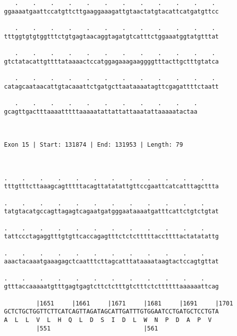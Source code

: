 \documentclass{article}
\begin{document}
\begin{Verbatim}
   .    .    .    .    .    .    .    .    .    .    .    . 
ggaaaatgaattccatgttcttgaaggaaagattgtaactatgtacattcatgatgttcc
                                                            
   .    .    .    .    .    .    .    .    .    .    .    . 
tttggtgtgtggtttctgtgagtaacaggtagatgtcatttctggaaatggtatgtttat
                                                            
   .    .    .    .    .    .    .    .    .    .    .    . 
gtctatacattgttttataaaactccatggagaaagaaggggtttacttgctttgtatca
                                                            
   .    .    .    .    .    .    .    .    .    .    .    . 
catagcaataacattgtacaaattctgatgcttaataaaatagttcgagattttctaatt
                                                            
   .    .    .    .    .    .    .    .    .    .    .
gcagttgactttaaaatttttaaaaatattattattaaatattaaaaatactaa
                                                      
                                                      
 
Exon 15 | Start: 131874 | End: 131953 | Length: 79



.    .    .    .    .    .    .    .    .    .    .    .    
tttgtttcttaaagcagtttttacagttatatattgttccgaattcatcatttagcttta
                                                            
.    .    .    .    .    .    .    .    .    .    .    .    
tatgtacatgccagttagagtcagaatgatgggaataaaatgatttcattctgtctgtat
                                                            
.    .    .    .    .    .    .    .    .    .    .    .    
tattccctagaggtttgtgttcaccagagtttctctctttttaccttttactatatattg
                                                            
.    .    .    .    .    .    .    .    .    .    .    .    
aaactacaaatgaaagagctcaatttcttagcatttataaaataagtactccagtgttat
                                                            
.    .    .    .    .    .    .    .    .    .    .    .    
gtttaccaaaaatgtttgagtgagtcttctctttgtctttctcttttttaaaaaattcag
                                                            
         |1651     |1661     |1671     |1681     |1691     |1701
GCTCTGCTGGTTCTTCATCAGTTAGATAGCATTGATTTGTGGAATCCTGATGCTCCTGTA
A  L  L  V  L  H  Q  L  D  S  I  D  L  W  N  P  D  A  P  V  
         |551                          |561                 
  

\end{Verbatim}
\end{document}
